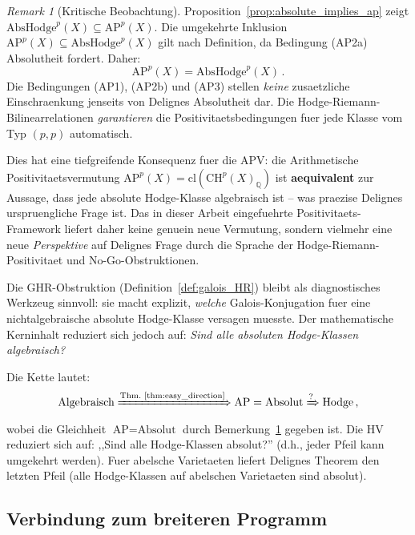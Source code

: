 \documentclass[aps,prd,twocolumn,superscriptaddress,nofootinbib]{revtex4-2}
\theoremstyle{definition}
\theoremstyle{remark}
\newtheorem{remark}[theorem]{Remark}
\begin{document}
\begin{remark}[Kritische Beobachtung]
\label{rem:ap_equals_absolute}
Proposition~\ref{prop:absolute_implies_ap} zeigt $\mathrm{AbsHodge}^p(X) \subseteq \mathrm{AP}^p(X)$. Die umgekehrte Inklusion $\mathrm{AP}^p(X) \subseteq \mathrm{AbsHodge}^p(X)$ gilt nach Definition, da Bedingung (AP2a) Absolutheit fordert. Daher:
\begin{equation}
\mathrm{AP}^p(X) = \mathrm{AbsHodge}^p(X)\,.
\end{equation}
Die Bedingungen (AP1), (AP2b) und (AP3) stellen \textit{keine} zusaetzliche Einschraenkung jenseits von Delignes Absolutheit dar. Die Hodge-Riemann-Bilinearrelationen \textit{garantieren} die Positivitaetsbedingungen fuer jede Klasse vom Typ $(p,p)$ automatisch.

Dies hat eine tiefgreifende Konsequenz fuer die APV: die Arithmetische Positivitaetsvermutung $\mathrm{AP}^p(X) = \mathrm{cl}(\mathrm{CH}^p(X)_\mathbb{Q})$ ist \textbf{aequivalent} zur Aussage, dass jede absolute Hodge-Klasse algebraisch ist -- was praezise Delignes urspruengliche Frage \cite{Deligne1982} ist. Das in dieser Arbeit eingefuehrte Positivitaets-Framework liefert daher keine genuein neue Vermutung, sondern vielmehr eine neue \textit{Perspektive} auf Delignes Frage durch die Sprache der Hodge-Riemann-Positivitaet und No-Go-Obstruktionen.

Die GHR-Obstruktion (Definition~\ref{def:galois_HR}) bleibt als diagnostisches Werkzeug sinnvoll: sie macht explizit, \textit{welche} Galois-Konjugation fuer eine nichtalgebraische absolute Hodge-Klasse versagen muesste. Der mathematische Kerninhalt reduziert sich jedoch auf: \textit{Sind alle absoluten Hodge-Klassen algebraisch?}
\end{remark}

Die Kette lautet:
\begin{equation}
\text{Algebraisch} \xRightarrow{\text{Thm.~\ref{thm:easy_direction}}} \text{AP} = \text{Absolut} \xRightarrow{\text{?}} \text{Hodge}\,,
\end{equation}
wobei die Gleichheit $\text{AP} = \text{Absolut}$ durch Bemerkung~\ref{rem:ap_equals_absolute} gegeben ist. Die HV reduziert sich auf: ,,Sind alle Hodge-Klassen absolut?'' (d.h., jeder Pfeil kann umgekehrt werden). Fuer abelsche Varietaeten liefert Delignes Theorem den letzten Pfeil (alle Hodge-Klassen auf abelschen Varietaeten sind absolut).

\subsection{Verbindung zum breiteren Programm}
\end{document}
